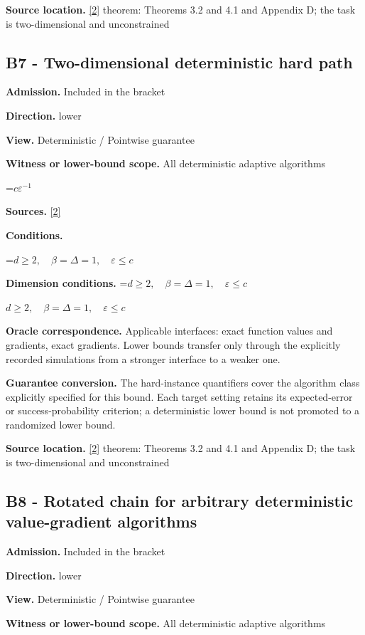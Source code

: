 \documentclass[10pt,a4paper]{article}
\newcommand{\AtlasMath}[1]{\par\begingroup\centering\setbox0=\hbox{$\displaystyle #1$}\ifdim\wd0>1.4\linewidth\typeout{ATLAS WIDE FORMULA: \the\wd0}\fi\ifdim\wd0>\linewidth\resizebox{\linewidth}{!}{\box0}\else\box0\fi\par\endgroup}
\newcommand{\AtlasInlineMath}[1]{\begingroup\setbox0=\hbox{$#1$}\ifdim\wd0>.4\linewidth\endgroup\AtlasMath{#1}\else\endgroup$#1$\fi}
\begin{document}
\textbf{Source location.} \href{https://arxiv.org/pdf/2310.09157}{[2]} theorem: Theorems 3.2 and 4.1 and Appendix D; the task is two-dimensional and unconstrained

\subsection{B7 - Two-dimensional deterministic hard path}
\textbf{Admission.} Included in the bracket

\textbf{Direction.} lower

\textbf{View.} Deterministic / Pointwise guarantee

\textbf{Witness or lower-bound scope.} All deterministic adaptive algorithms

\AtlasMath{c\varepsilon^{-1}}
\textbf{Sources.} \href{https://arxiv.org/pdf/2310.09157}{[2]}

\textbf{Conditions.} 
\AtlasMath{d\ge2,\quad\beta=\Delta=1,\quad\varepsilon\le c}


\textbf{Dimension conditions.} \AtlasInlineMath{d\ge2,\quad\beta=\Delta=1,\quad\varepsilon\le c}

\textbf{Oracle correspondence.} Applicable interfaces: exact function values and gradients, exact gradients. Lower bounds transfer only through the explicitly recorded simulations from a stronger interface to a weaker one.

\textbf{Guarantee conversion.} The hard-instance quantifiers cover the algorithm class explicitly specified for this bound. Each target setting retains its expected-error or success-probability criterion; a deterministic lower bound is not promoted to a randomized lower bound.

\textbf{Source location.} \href{https://arxiv.org/pdf/2310.09157}{[2]} theorem: Theorems 3.2 and 4.1 and Appendix D; the task is two-dimensional and unconstrained

\subsection{B8 - Rotated chain for arbitrary deterministic value-gradient algorithms}
\textbf{Admission.} Included in the bracket

\textbf{Direction.} lower

\textbf{View.} Deterministic / Pointwise guarantee

\textbf{Witness or lower-bound scope.} All deterministic adaptive algorithms
\end{document}
